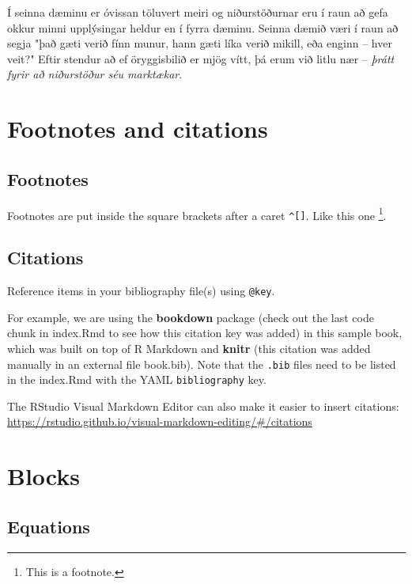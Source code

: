 \documentclass[
]{book}
\theoremstyle{definition}
\theoremstyle{definition}
\theoremstyle{definition}
\theoremstyle{definition}
\theoremstyle{remark}
\begin{document}
Í seinna dæminu er óvissan töluvert meiri og niðurstöðurnar eru í raun að gefa okkur minni upplýsingar heldur en í fyrra dæminu. Seinna dæmið væri í raun að segja "það gæti verið fínn
munur, hann gæti líka verið mikill, eða enginn -- hver veit?" Eftir stendur að ef öryggisbilið er mjög vítt, þá erum við litlu nær -- \emph{þrátt fyrir að niðurstöður séu marktækar}.

\hypertarget{footnotes-and-citations}{%
\chapter{Footnotes and citations}\label{footnotes-and-citations}}

\hypertarget{footnotes}{%
\section{Footnotes}\label{footnotes}}

Footnotes are put inside the square brackets after a caret \texttt{\^{}{[}{]}}. Like this one \footnote{This is a footnote.}.

\hypertarget{citations}{%
\section{Citations}\label{citations}}

Reference items in your bibliography file(s) using \texttt{@key}.

For example, we are using the \textbf{bookdown} package \citep{R-bookdown} (check out the last code chunk in index.Rmd to see how this citation key was added) in this sample book, which was built on top of R Markdown and \textbf{knitr} \citep{xie2015} (this citation was added manually in an external file book.bib). Note that the \texttt{.bib} files need to be listed in the index.Rmd with the YAML \texttt{bibliography} key.

The RStudio Visual Markdown Editor can also make it easier to insert citations: \url{https://rstudio.github.io/visual-markdown-editing/\#/citations}

\hypertarget{blocks}{%
\chapter{Blocks}\label{blocks}}

\hypertarget{equations}{%
\section{Equations}\label{equations}}
\end{document}
